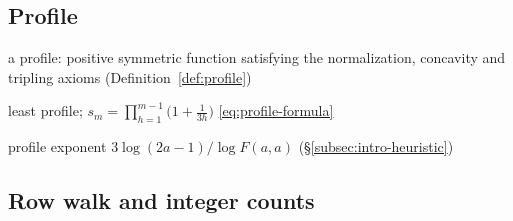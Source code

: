 {\subsection*{Profile}

\begin{list}{}{\setlength{\leftmargin}{0.22\textwidth}%
 \setlength{\labelwidth}{0.2\textwidth}\setlength{\labelsep}{0.02\textwidth}%
 \setlength{\itemsep}{1pt}\setlength{\parsep}{0pt}\setlength{\topsep}{0pt}%
 \renewcommand{\makelabel}[1]{#1\hfil}}
\item[\(P\)] a profile: positive symmetric function satisfying the
 normalization, concavity and tripling axioms
 (Definition~\ref{def:profile})
\item[\(F\), \(s_m\)] least profile;
 \(s_m=\prod_{h=1}^{m-1}\bigl(1+\frac1{3h}\bigr)\)
 \eqref{eq:profile-formula}
\item[\(\tau_a\)] profile exponent \(3\log(2a-1)/\log F(a,a)\)
 (\S\ref{subsec:intro-heuristic})
\end{list}

\subsection*{Row walk and integer counts}

}
